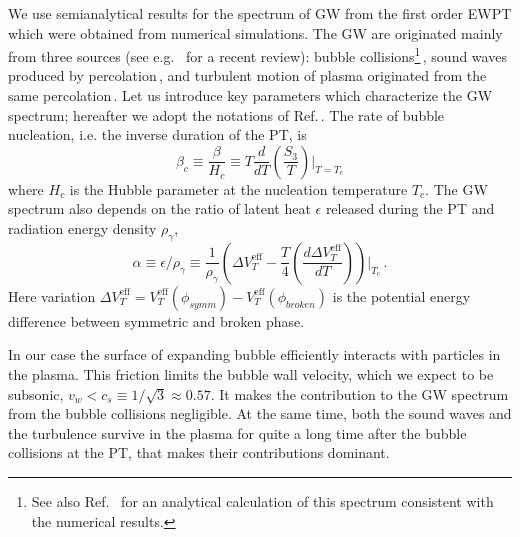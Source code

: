 \documentclass[12pt]{article}
\begin{document}
 
We use semianalytical results for the spectrum of GW from the first
order EWPT which were obtained from numerical simulations.  The
GW are originated mainly from three sources (see
e.g.~\cite{Caprini:2015zlo} for a recent review): bubble 
collisions\footnote{
See also Ref.~\cite{Jinno:2016vai} for an analytical calculation of
this spectrum consistent with the numerical
results.}\,\cite{Huber:2008hg},
sound waves produced by
percolation\,\cite{Hindmarsh:2015qta}, 
and turbulent motion of plasma originated from the same
percolation\,\cite{Caprini:2009yp}. Let us introduce key
parameters which characterize the GW spectrum; hereafter we adopt the
notations of Ref.\,\cite{Caprini:2015zlo}. The rate of bubble
nucleation, i.e. the inverse
duration of the PT,  is
\begin{equation}
\beta_c \equiv  \frac{\beta}{H_c} \equiv T\frac{d}{dT}\left(\frac{S_3}{T}\right)\Bigg|_{T=T_c}
\end{equation}
where  $H_c$ is the  Hubble 
parameter at the nucleation temperature $T_c$.
The GW spectrum also depends on the ratio of latent heat $\epsilon$
released during the PT and radiation energy  density
$\rho_{\gamma}$, 
\begin{equation}
\alpha \equiv \epsilon/\rho_{\gamma}\equiv \frac{1}{\rho_\gamma}\left(\Delta  V_T^{\text{eff}} 
-\frac{T}{4}    \left(\frac{d \Delta V_T^{\text{eff}}}{d T}\right)\right)\Bigg|_{T_c}\,.
\end{equation}
Here variation 
$\Delta  V_T^{\text{eff}} =  V_T^{\text{eff}}(\phi_{symm}) -
V_T^{\text{eff}}(\phi_{broken})$ is the potential energy difference
between symmetric and broken phase.



In our case the surface of expanding bubble efficiently interacts with
particles in the plasma. This friction limits the bubble wall
velocity, which we expect to be subsonic, $v_w<c_s\equiv1/\sqrt{3}\approx
0.57$. It makes the contribution to the GW spectrum from the
  bubble collisions
negligible. At the same time, both the sound waves and the turbulence 
survive in the plasma for quite a long time after the bubble
collisions at the PT, that makes their contributions dominant.  
\end{document}

